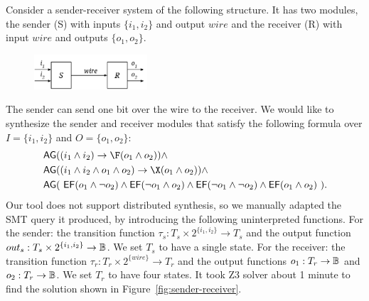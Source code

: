 Consider a sender-receiver system of the following structure.
It has two modules,
the sender (S) with inputs $\{i_1, i_2\}$ and output $wire$
and the receiver (R) with input $wire$ and outputs $\{o_1,o_2\}$.
\begin{figure}
\vspace{-0.2cm}
\centering
\includegraphics[width=4.2cm]{figures/sender-receiver.pdf}
\vspace{-0.5cm}
\end{figure}
The sender can send one bit over the wire to the receiver.
We would like to synthesize the sender and receiver modules that satisfy
the following \CTLstar formula over $I = \{i_1,i_2\}$ and $O=\{o_1,o_2\}$:
\begin{align*}
& \AG((i_1 \land i_2)  \impl  \F(o_1  \land  o_2))  \land  \\
& \AG((i_1 \land i_2 \land o_1 \land o_2)  \impl  \X(o_1 \land o_2))  \land  \\
& \AG(~\EF(o_1 \land  \neg o_2)  \land  
       \EF( \neg o_1 \land o_2)  \land  
       \EF( \neg o_1 \land  \neg o_2)  \land  
       \EF(o_1 \land o_2)~).
\end{align*}
Our tool does not support distributed synthesis,
so we manually adapted the SMT query it produced,
by introducing the following uninterpreted functions.
\li
\- For the sender:
   the transition function $\tau_s: T_s \times 2^{\{i_1,i_2\}} \to T_s$
   and the output function $out_s: T_s \times 2^{\{i_1,i_2\}} \to \mathbb{B}$.
   We set $T_s$ to have a single state.
\- For the receiver:
   the transition function $\tau_r: T_r \times 2^{\{wire\}} \to T_r$
   and the output functions $o_1: T_r \to \mathbb{B}$ and $o_2: T_r \to \mathbb{B}$.
   We set $T_r$ to have four states.
\il
It took Z3 solver about 1 minute to find the solution shown in Figure~\ref{fig:sender-receiver}.

